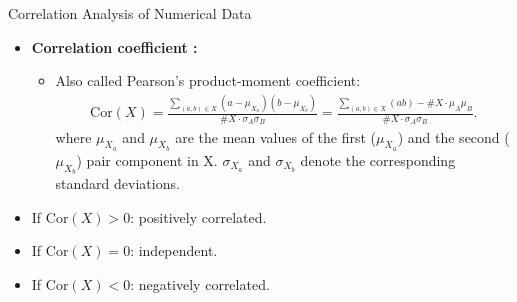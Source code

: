 \begin{frame}{Correlation Analysis of Numerical Data}
	\begin{itemize}
		\item \textbf{\color{airforceblue}Correlation coefficient :}
		\begin{itemize}
			\item Also called Pearson's product-moment coefficient:
			\begin{align}
				\text{Cor}({X}) = \frac{\sum_{(a, b) \in X} 
				(a-\mu_{X_a})(b-\mu_{X_b})}{\#X\cdot\sigma_A\sigma_B} = 
				\frac{\sum_{(a, b) \in X}(a b)-\#X\cdot\mu_A\mu_B}{\#X\cdot
				\sigma_A\sigma_B}. 
			\end{align}
			where $\mu_{X_a}$ and $\mu_{X_b}$ are the mean values 
			of the first ($\mu_{X_a}$) and the second ($\mu_{X_b}$) pair 
			component in X. $\sigma_{X_a}$ and $\sigma_{X_b}$ 
			denote the corresponding standard deviations.
		\end{itemize}
		\item If $\text{Cor}({X}) > 0$: positively correlated.
		\item If $\text{Cor}({X}) = 0$: independent.
		\item If $\text{Cor}({X}) < 0$: negatively correlated.
	\end{itemize}
\end{frame}

